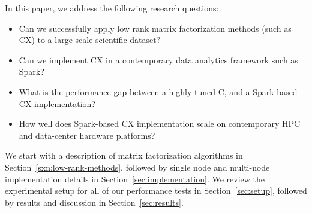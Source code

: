 In this paper, we address the following research questions:
\begin{itemize}
\item Can we successfully apply low rank matrix factorization methods (such as CX) to a large scale scientific dataset?

\item Can we implement CX in a contemporary data analytics framework such as Spark?

\item What is the performance gap between a highly tuned C, and a Spark-based CX implementation? 

\item How well does Spark-based CX implementation scale on contemporary HPC and data-center hardware platforms?
\end{itemize}

We start with a description of matrix factorization algorithms in Section~\ref{sxn:low-rank-methods}, followed by single node and multi-node implementation details in Section~\ref{sec:implementation}. We review the experimental setup for all of our performance tests in Section~\ref{sec:setup}, followed by results and discussion in Section~\ref{sec:results}.

